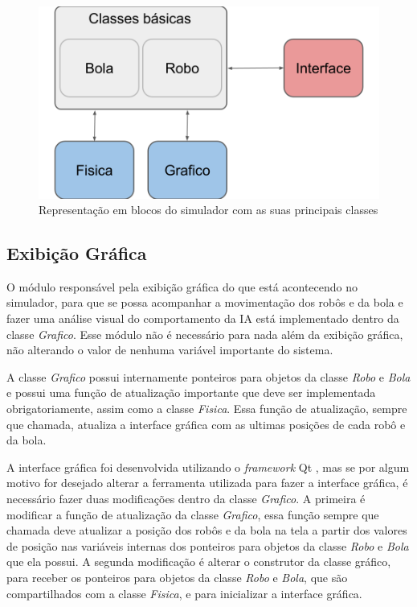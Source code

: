 \begin{figure}[H]
    \caption{\label{img:simulador_blocos}Representação em blocos do simulador com as suas principais classes}
	\begin{center}
        \includegraphics[scale=0.3]{img/sim_blocos.png}
	\end{center}
\end{figure}

\subsection{Exibição Gráfica}

O módulo responsável pela exibição gráfica do que está acontecendo no simulador, para que se possa acompanhar a movimentação dos robôs e da bola e fazer uma análise visual do comportamento da IA está implementado dentro da classe \textit{Grafico}. Esse módulo não é necessário para nada além da exibição gráfica, não alterando o valor de nenhuma variável importante do sistema.

A classe \textit{Grafico} possui internamente ponteiros para objetos da classe \textit{Robo} e \textit{Bola} e possui uma função de atualização importante que deve ser implementada obrigatoriamente, assim como a classe \textit{Fisica}. Essa função de atualização, sempre que chamada, atualiza a interface gráfica com as ultimas posições de cada robô e da bola.

A interface gráfica foi desenvolvida utilizando o \textit{framework} Qt , mas se por algum motivo for desejado alterar a ferramenta utilizada para fazer a interface gráfica, é necessário fazer duas modificações dentro da classe \textit{Grafico}. A primeira é modificar a função de atualização da classe \textit{Grafico}, essa função sempre que chamada deve atualizar a posição dos robôs e da bola na tela a partir dos valores de posição nas variáveis internas dos ponteiros para objetos da classe \textit{Robo} e \textit{Bola} que ela possui. A segunda modificação é alterar o construtor da classe gráfico, para receber os ponteiros para objetos da classe \textit{Robo} e \textit{Bola}, que são compartilhados com a classe \textit{Fisica}, e para inicializar a interface gráfica.


